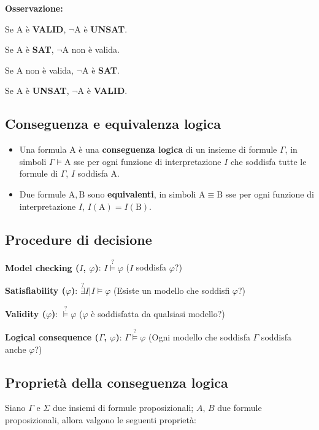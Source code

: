 \textbf{Osservazione:}

Se $\mathrm{A}$ è \textbf{VALID}, $\lnot \mathrm{A}$ è \textbf{UNSAT}.

Se $\mathrm{A}$ è \textbf{SAT}, $\lnot \mathrm{A}$ non è valida.

Se $\mathrm{A}$ non è valida, $\lnot \mathrm{A}$ è \textbf{SAT}.

Se $\mathrm{A}$ è \textbf{UNSAT}, $\lnot \mathrm{A}$ è \textbf{VALID}. 


\subsection{Conseguenza e equivalenza logica}
\begin{itemize}
\item Una formula $\mathrm{A}$ è una \textbf{conseguenza logica} di un insieme di formule $\Gamma$, in simboli $\Gamma \models \mathrm{A}$ sse per ogni funzione di interpretazione $I$ che soddisfa tutte le formule di $\Gamma$, $I$ soddisfa $\mathrm{A}$.

\item Due formule $\mathrm{A}, \mathrm{B}$ sono \textbf{equivalenti}, in simboli $\mathrm{A} \equiv \mathrm{B}$ sse per ogni funzione di interpretazione $I$, $I(\mathrm{A}) = I(\mathrm{B})$. 
\end{itemize}

\subsection{Procedure di decisione}

\textbf{Model checking ($I$, $\varphi$)}: $I \stackrel{?}{\models} \varphi$ ($I$ soddisfa $\varphi$?)

\textbf{Satisfiability ($\varphi$)}: $\stackrel{?}{\exists} I | I \models \varphi$ (Esiste un modello che soddisfi $\varphi$?)

\textbf{Validity ($\varphi$)}: $\stackrel{?}{\models} \varphi$ ($\varphi$ è soddisfatta da qualsiasi modello?)

\textbf{Logical consequence ($\Gamma$, $\varphi$)}: $\Gamma \stackrel{?}{\models} \varphi$ (Ogni modello che soddisfa $\Gamma$ soddisfa anche $\varphi$?)

\subsection{Proprietà della conseguenza logica}
Siano $\Gamma$ e $\Sigma$ due insiemi di formule proposizionali; $A$, $B$ due formule proposizionali, allora valgono le seguenti proprietà:

